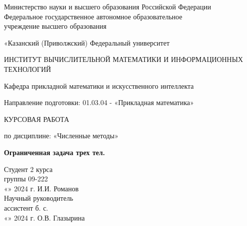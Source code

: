 \documentclass[a4paper,12pt]{article}
\begin{document}
	\renewcommand\contentsname{Содержание}
	\renewcommand{\arraystretch}{1.3} 
	\thispagestyle{empty}
	\begin{center}
		Министерство науки и высшего образования Российской Федерации\\
        Федеральное государственное автономное образовательное\\
        учреждение высшего образования
		\vspace{0.1cm}
		
		«Казанский (Приволжский)  Федеральный университет
		\vspace{1cm}
		
		ИНСТИТУТ ВЫЧИСЛИТЕЛЬНОЙ МАТЕМАТИКИ И ИНФОРМАЦИОННЫХ ТЕХНОЛОГИЙ
		
		Кафедра прикладной математики и искусственного интеллекта

		\vspace{1cm}

		Направление подготовки: 01.03.04 - «Прикладная математика»
	\end{center}
	\vspace{1cm}
	
	\begin{center}
		КУРСОВАЯ РАБОТА
		\vspace{0.2cm}
		
		по дисциплине: «Численные методы»
		\vspace{0.2cm}
		
		\textbf{Ограниченная задача трех тел.}
	\end{center}
	\vspace{3cm}
	Студент 2 курса\\
	группы 09-222\\
	«\underline{\qquad}» \underline{\qquad\qquad} 2024 г. \qquad\qquad\quad \underline{\qquad\qquad\qquad\quad} \qquad И.И. 	Романов\\
	Научный руководитель\\
	ассистент б. с.\\
	«\underline{\qquad}» \underline{\qquad\qquad} 2024 г. \qquad\qquad\quad \underline{\qquad\qquad\qquad\quad} \qquad О.В. 	Глазырина
	\vfill
	
\end{document}
